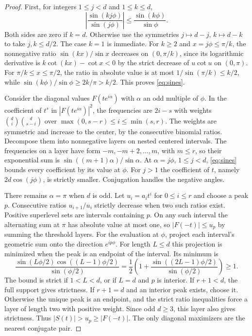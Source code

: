 \documentclass[11pt]{article}
\begin{document}
\begin{proof}
First, for integers \(1\le j<d\) and \(1\le k\le d\),
\begin{equation}\label{eq:sines}
\left|\frac{\sin(kj\phi)}{\sin(j\phi)}\right|
 \le \frac{\sin(k\phi)}{\sin\phi}.
\end{equation}
Both sides are zero if \(k=d\). Otherwise use the symmetries
\(j\mapsto d-j\), \(k\mapsto d-k\) to take \(j,k\le d/2\).
The case \(k=1\) is immediate. For \(k\ge2\) and
\(x=j\phi\le\pi/k\), the nonnegative ratio
\(\sin(kx)/\sin x\) decreases on \((0,\pi/k)\), since its
logarithmic derivative is \(k\cot(kx)-\cot x<0\) by the
strict decrease of \(u\cot u\) on \((0,\pi)\). For
\(\pi/k\le x\le\pi/2\), the ratio in absolute value is at
most \(1/\sin(\pi/k)\le k/2\), while
\(\sin(k\phi)/\sin\phi\ge2k/\pi>k/2\).
This proves \eqref{eq:sines}.

Consider the diagonal values \(F(te^{i\alpha})\) with
\(\alpha\) an odd multiple of \(\phi\). In the coefficient
of \(t^s\) in \(|F(te^{i\alpha})|^2\), the frequencies are
\(2i-s\) with weights \(\binom di\binom d{s-i}\) over
\(\max(0,s-r)\le i\le\min(s,r)\).
The weights are symmetric and increase to the center, by
the consecutive binomial ratios. Decompose them into
nonnegative layers on nested centered intervals. The
frequencies on a layer have form \(-m,-m+2,\ldots,m\),
with \(m\le r\), so their exponential sum is
\(\sin((m+1)\alpha)/\sin\alpha\).
At \(\alpha=j\phi\), \(1\le j<d\), \eqref{eq:sines}
bounds every coefficient by its value at \(\phi\).
For \(j>1\) the coefficient of \(t\), namely
\(2d\cos(j\phi)\), is strictly smaller. Conjugation
handles the negative angles.

There remains \(\alpha=\pi\) when \(d\) is odd.
Let \(u_i=a_i t^i\) for \(0\le i\le r\) and choose a peak
\(p\). Consecutive ratios \(u_{i+1}/u_i\) strictly decrease
when two such ratios exist. Positive superlevel sets
are intervals containing \(p\). On any such interval the
alternating sum at \(\pi\) has absolute value at most one,
so \(|F(-t)|\le u_p\) by summing the threshold layers.
For the evaluation at \(\phi\), project each interval's
geometric sum onto the direction \(e^{ip\phi}\).
For length \(L\le d\) this projection is minimized when
the peak is an endpoint of the interval. Its minimum is
\[
\frac{\sin(L\phi/2)\cos((L-1)\phi/2)}{\sin(\phi/2)}
 =\frac12\left(1+\frac{\sin((2L-1)\phi/2)}{\sin(\phi/2)}\right)
 \ge1.
\]
The bound is strict if \(1<L<d\), or if \(L=d\) and \(p\)
is interior. If \(r+1<d\), the full support gives strictness.
If \(r+1=d\) and an interior peak exists, choose it.
Otherwise the unique peak is an endpoint, and the strict
ratio inequalities force a layer of length two with
positive weight. Since odd \(d\ge3\), this layer also gives
strictness. Thus \(|S(t)|>u_p\ge|F(-t)|\).
The only diagonal maximizers are the nearest conjugate pair.


\end{proof}
\end{document}
